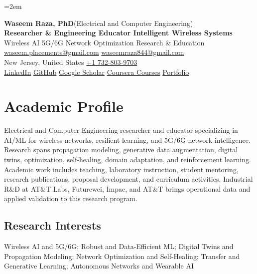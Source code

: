 \documentclass[9pt,letterpaper]{extarticle}
\begin{document}
\emergencystretch=2em
\begin{center}
{\LARGE\bfseries Waseem Raza, PhD}{\normalsize\mdseries \enspace (Electrical and Computer Engineering)}\\[2pt]
{\large\bfseries Researcher \& Engineering Educator \textbar{} Intelligent Wireless Systems}\\[1pt]
{\small Wireless AI \textbar{} 5G/6G \textbar{} Network Optimization \textbar{} Research \& Education}\\[3pt]
{\footnotesize {}\enspace \href{mailto:waseem.placements@gmail.com}{waseem.placements@gmail.com} \textbar{} \href{mailto:waseemraza844@gmail.com}{waseemraza844@gmail.com}\\[1pt]New Jersey, United States \quad {}\enspace \href{tel:+17328039703}{+1 732-803-9703}\\[1pt]\href{https://www.linkedin.com/in/waseem-raza-phd-9a737858/}{LinkedIn} \textbar{} \href{https://github.com/WaseemRaza844}{GitHub} \textbar{} \href{https://scholar.google.com/citations?user=d58Drr0AAAAJ\&hl=en}{Google Scholar} \textbar{} \href{https://waseemraza844.github.io/portfolio/learning.html}{Coursera Courses} \textbar{} \href{https://waseemraza844.github.io/portfolio/}{Portfolio}}
\end{center}
\vspace{-5pt}
\section{Academic Profile}
Electrical and Computer Engineering researcher and educator specializing in AI/ML for wireless networks, resilient learning, and 5G/6G network intelligence. Research spans propagation modeling, generative data augmentation, digital twins, optimization, self-healing, domain adaptation, and reinforcement learning. Academic work includes teaching, laboratory instruction, student mentoring, research publications, proposal development, and curriculum activities. Industrial R\&D at AT\&T Labs, Futurewei, Impac, and AT\&T brings operational data and applied validation to this research program.
\subsection{Research Interests}
Wireless AI and 5G/6G; Robust and Data-Efficient ML; Digital Twins and Propagation Modeling; Network Optimization and Self-Healing; Transfer and Generative Learning; Autonomous Networks and Wearable AI\par
{}
\end{document}
